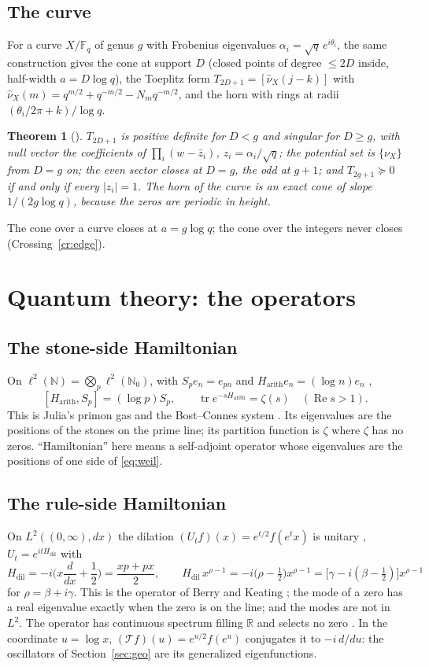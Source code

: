 \documentclass[11pt]{article}
\newtheorem{theorem}{Theorem}[section]
\theoremstyle{definition}
\theoremstyle{remark}
\newcommand{\R}{\mathbb R}
\newcommand{\F}{\mathbb F}
\newcommand{\Ree}{\operatorname{Re}}
\newcommand{\tr}{\operatorname{tr}}
\begin{document}
\subsection{The curve}
For a curve $X/\F_q$ of genus $g$ with Frobenius eigenvalues $\alpha_i=\sqrt q\,e^{i\theta_i}$, the same construction gives the cone at support $D$ (closed points of degree $\le2D$ inside, half-width $a=D\log q$), the Toeplitz form $T_{2D+1}=[\hat\nu_X(j-k)]$ with $\hat\nu_X(m)=q^{m/2}+q^{-m/2}-N_mq^{-m/2}$, and the horn with rings at radii $(\theta_i/2\pi+k)/\log q$.
\begin{theorem}[{\cite[\S2]{ffcone}}]\label{thm:ffcone}
$T_{2D+1}$ is positive definite for $D<g$ and singular for $D\ge g$, with null vector the coefficients of $\prod_i(w-\bar z_i)$, $z_i=\alpha_i/\sqrt q$; the potential set is $\{\nu_X\}$ from $D=g$ on; the even sector closes at $D=g$, the odd at $g+1$; and $T_{2g+1}\succeq0$ if and only if every $|z_i|=1$. The horn of the curve is an exact cone of slope $1/(2g\log q)$, because the zeros are periodic in height.
\end{theorem}
The cone over a curve closes at $a=g\log q$; the cone over the integers never closes (Crossing~\ref{cr:edge}).

\section{Quantum theory: the operators}\label{sec:quantum}

\subsection{The stone-side Hamiltonian}
On $\ell^2(\mathbb N)=\bigotimes_p\ell^2(\mathbb N_0)$, with $S_pe_n=e_{pn}$ and $H_{\mathrm{arith}}e_n=(\log n)e_n$ \cite[\S2]{v32},
\[
[H_{\mathrm{arith}},S_p]=(\log p)S_p,\qquad\tr e^{-sH_{\mathrm{arith}}}=\zeta(s)\quad(\Ree s>1).
\]
This is Julia's primon gas and the Bost--Connes system \cite{bc}. Its eigenvalues are the positions of the stones on the prime line; its partition function is $\zeta$ where $\zeta$ has no zeros. ``Hamiltonian'' here means a self-adjoint operator whose eigenvalues are the positions of one side of \eqref{eq:weil}.

\subsection{The rule-side Hamiltonian}
On $L^2((0,\infty),dx)$ the dilation $(U_tf)(x)=e^{t/2}f(e^tx)$ is unitary \cite[Part VI]{running}, $U_t=e^{itH_{\mathrm{dil}}}$ with
\[
H_{\mathrm{dil}}=-i\Big(x\frac d{dx}+\frac12\Big)=\frac{xp+px}2,\qquad H_{\mathrm{dil}}\,x^{\rho-1}=-i\big(\rho-\tfrac12\big)x^{\rho-1}=\big[\gamma-i(\beta-\tfrac12)\big]x^{\rho-1}
\]
for $\rho=\beta+i\gamma$. This is the operator of Berry and Keating \cite{bk}; the mode of a zero has a real eigenvalue exactly when the zero is on the line; and the modes are not in $L^2$. The operator has continuous spectrum filling $\R$ and selects no zero \cite{es}. In the coordinate $u=\log x$, $(\mathcal Tf)(u)=e^{u/2}f(e^u)$ conjugates it to $-i\,d/du$: the oscillators of Section~\ref{sec:geo} are its generalized eigenfunctions.
\end{document}
